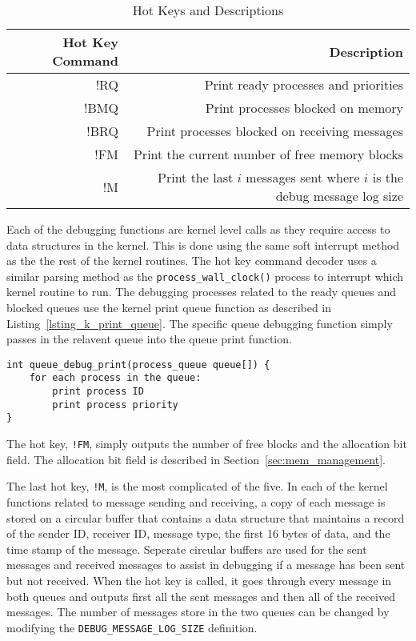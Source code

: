 \documentclass[oneside]{report}
\begin{document}
\begin{table}[h]
    \caption{Hot Keys and Descriptions}
    \label{hot_keys_table}
    \begin{tabular}{| r | r |}
        \hline
        Hot Key Command & Description \\
        \hline
        !RQ & Print ready processes and priorities \\ 
        !BMQ & Print processes blocked on memory \\ 
        !BRQ & Print processes blocked on receiving messages \\ 
        !FM & Print the current number of free memory blocks \\ 
        !M & Print the last $i$ messages sent where $i$ is the debug message
        log size \\
        \hline
    \end{tabular}
\end{table}

Each of the debugging functions are kernel level calls as they require access
to data structures in the kernel. This is done using the same soft interrupt
method as the the rest of the kernel routines. The hot key command decoder
uses a similar parsing method as the \texttt{process\_wall\_clock()} process to
interrupt which kernel routine to run. The debugging processes related to the
ready queues and blocked queues use the kernel print queue function as
described in Listing~\ref{lsting_k_print_queue}. The specific queue debugging 
function simply passes in the relavent queue into the queue print function.

\begin{lstlisting}
int queue_debug_print(process_queue queue[]) {
    for each process in the queue:
        print process ID
        print process priority
}
\end{lstlisting}

The hot key, \texttt{!FM}, simply outputs the number of free blocks and the
allocation bit field. The allocation bit field is described in
Section~\ref{sec:mem_management}.

The last hot key, \texttt{!M}, is the most complicated of the five. In each of
the kernel functions related to message sending and receiving, a copy of each
message is stored on a circular buffer that contains a data structure that
maintains a record of the sender ID, receiver ID, message type, the first 16
bytes of data, and the time stamp of the message. Seperate circular buffers are
used for the sent messages and received messages to assist in debugging if a
message has been sent but not received.  When the hot key is called, it goes
through every message in both queues and outputs first all the sent messages
and then all of the received messages. The number of messages store in the two
queues can be changed by modifying the \texttt{DEBUG\_MESSAGE\_LOG\_SIZE}
definition. 
\end{document}
